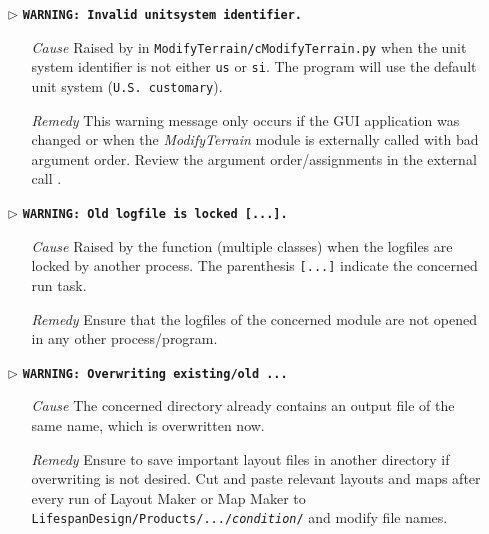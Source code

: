 \begin{itemize}
	\item[$\triangleright$]\textbf{\texttt{WARNING: Invalid unit{\myUnderscore}system identifier.}}
	\begin{itemize}
		\item[\textit{Cause}\hspace{0.27cm}]Raised by  in \texttt{ModifyTerrain/cModifyTerrain.py} when the unit system identifier is not either \texttt{us} or \texttt{si}. The program will use the default unit system (\texttt{U.S. customary}).
		\item[\textit{Remedy}] This warning message only occurs if the GUI application was changed or when the \textit{ModifyTerrain} module is externally called with bad argument order. Review the argument order/assignments in the external call .\\
	\end{itemize}
	
	\item[$\triangleright$]\textbf{\texttt{WARNING: Old logfile is locked [...].}}
	\begin{itemize}
		\item[\textit{Cause}\hspace{0.27cm}] Raised by the  function (multiple classes) when the logfiles are locked by another process. The parenthesis \texttt{[...]} indicate the concerned run task.
		\item[\textit{Remedy}] Ensure that the logfiles of the concerned module are not opened in any other process/program.\\
	\end{itemize}
	
	\item[$\triangleright$]\textbf{\texttt{WARNING: Overwriting existing/old ...}}
	\begin{itemize}
		\item[\textit{Cause}\hspace{0.27cm}] The concerned directory already contains an output file of the same name, which is overwritten now. 
		\item[\textit{Remedy}] Ensure to save important layout files in another directory if overwriting is not desired. Cut and paste relevant layouts and maps after every run of Layout Maker or Map Maker to \texttt{LifespanDesign/Products/.../\textit{condition}/} and modify file names.\\
	\end{itemize}
	

\end{itemize}
